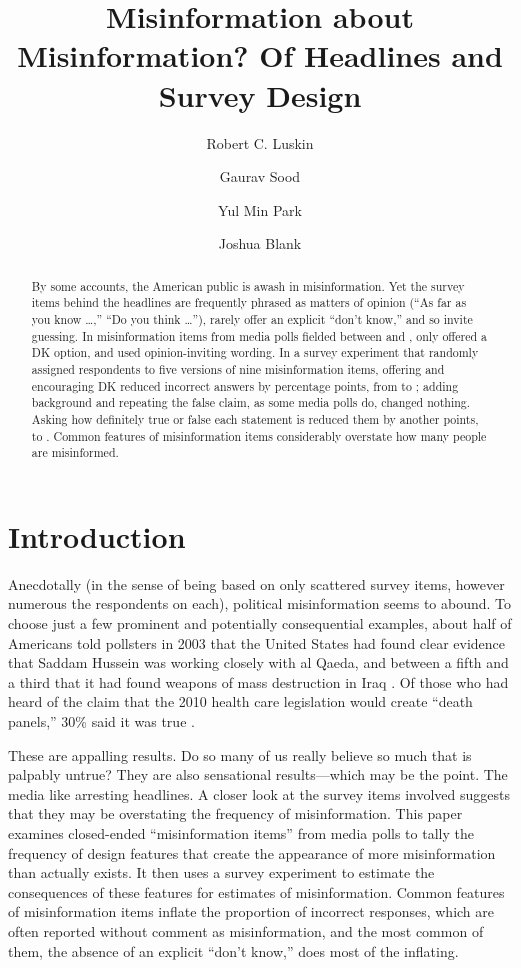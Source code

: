 \documentclass[11pt]{article}
\title{Misinformation about Misinformation? Of Headlines and Survey Design}
\author{Robert C. Luskin \and Gaurav Sood \and Yul Min Park \and Joshua Blank}
\date{}
\begin{document}
\maketitle

\begin{abstract}
\noindent By some accounts, the American public is awash in misinformation. Yet the survey items behind the headlines are frequently phrased as matters of opinion (``As far as you know \ldots,'' ``Do you think \ldots''), rarely offer an explicit ``don't know,'' and so invite guessing. In \nKept{} misinformation items from media polls fielded between \firstYear{} and \lastYear{}, only \shareDkShown{} offered a DK option, and \shareOpinion{} used opinion-inviting wording. In a survey experiment that randomly assigned \nJuly{} respondents to five versions of nine misinformation items, offering and encouraging DK reduced incorrect answers by \dkEffect{} percentage points, from \meanMedia{} to \meanFewer{}; adding background and repeating the false claim, as some media polls do, changed nothing. Asking how definitely true or false each statement is reduced them by another \scaleEffect{} points, to \meanScale{}. Common features of misinformation items considerably overstate how many people are misinformed.
\end{abstract}

\section{Introduction}

Anecdotally (in the sense of being based on only scattered survey items, however numerous the respondents on each), political misinformation seems to abound. To choose just a few prominent and potentially consequential examples, about half of Americans told pollsters in 2003 that the United States had found clear evidence that Saddam Hussein was working closely with al Qaeda, and between a fifth and a third that it had found weapons of mass destruction in Iraq \citep[572--73]{kull2003}. Of those who had heard of the claim that the 2010 health care legislation would create ``death panels,'' 30\% said it was true \citep{pew2009}.

These are appalling results. Do so many of us really believe so much that is palpably untrue? They are also sensational results---which may be the point. The media like arresting headlines. A closer look at the survey items involved suggests that they may be overstating the frequency of misinformation. This paper examines \nKept{} closed-ended ``misinformation items'' from media polls to tally the frequency of design features that create the appearance of more misinformation than actually exists. It then uses a survey experiment to estimate the consequences of these features for estimates of misinformation. Common features of misinformation items inflate the proportion of incorrect responses, which are often reported without comment as misinformation, and the most common of them, the absence of an explicit ``don't know,'' does most of the inflating.
\end{document}
